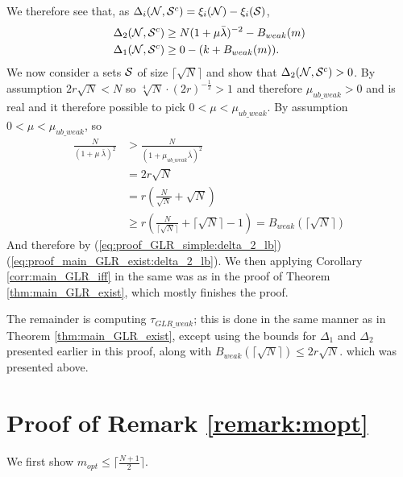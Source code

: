 We therefore see that, as $\Delta_{i}(\mathcal{N},\mathcal{S}^{c}) = \xi_{i}(\mathcal{N}) - \xi_{i}(\mathcal{S})$,
\begin{align}
    \Delta_{2}(\mathcal{N},\mathcal{S}^{c}) &\geq N(1 + \mu\bar{\lambda})^{-2} - B_{weak}(m) \label{eq:proof_GLR_simple:delta_2_lb}\\
    \Delta_{1}(\mathcal{N},\mathcal{S}^{c}) &\geq 0 - (k + B_{weak}(m)).
\end{align}
We now consider a sets $\mathcal{S}$ of size $\lceil\sqrt{N}\rceil$ and show that $\Delta_{2}(\mathcal{N},\mathcal{S}^{c}) > 0$. By assumption $2r\sqrt{N} < N$ so $\sqrt[4]{N}\cdot(2r)^{-\frac{1}{2}} > 1$ and therefore $\mu_{ub\_weak} > 0$ and is real and it therefore possible to pick $0 < \mu < \mu_{ub\_weak}$.
By assumption $0<\mu<\mu_{ub\_weak}$, so 
\begin{align}
     \frac{N}{\left(1+\mu\ \bar{\lambda} \right)^{2}}
    &> \frac{N}{\left(1+\mu_{ub\_weak}\bar{\lambda} 
  \right)^{2}}\\ 
    &= 2r\sqrt{N} \\
    &= r \left(\frac{N}{\sqrt{N}} + \sqrt{N} \right) \\
    &\geq r\left(\frac{N}{\lceil\sqrt{N}\rceil} + \lceil\sqrt{N}\rceil - 1 \right) = B_{weak}(\lceil\sqrt{N}\rceil)
\end{align}
And therefore by (\ref{eq:proof_GLR_simple:delta_2_lb}) (\ref{eq:proof_main_GLR_exist:delta_2_lb}). We then applying Corollary \ref{corr:main_GLR_iff} in the same was as in the proof of Theorem \ref{thm:main_GLR_exist}, which mostly finishes the proof.

The remainder is computing $\tau_{GLR\_weak}$; this is done in the same manner as in Theorem \ref{thm:main_GLR_exist}, except using the bounds for $\Delta_{1}$ and $\Delta_{2}$ presented earlier in this proof, along with $B_{weak}(\lceil\sqrt{N}\rceil) \leq 2r\sqrt{N}$. which was presented above.


\section{Proof of Remark \ref{remark:mopt}}
\label{app:proof_of_remark_GLR_mopt}
We first show $m_{opt} \leq \lceil\frac{N+1}{2}\rceil$. 

